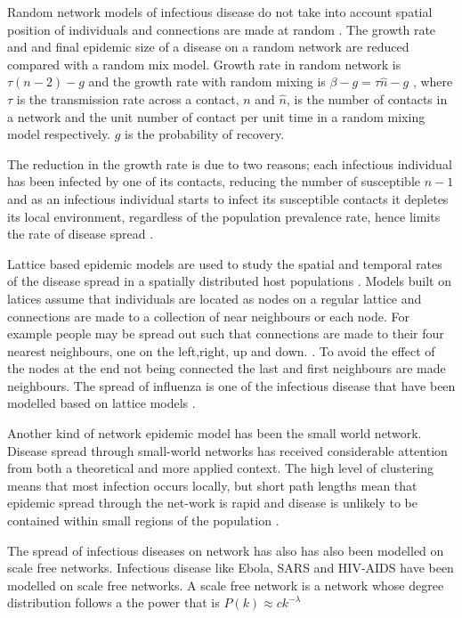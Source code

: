  Random network models of infectious disease do not take into account spatial position of individuals and connections are made at random \citep{keeling2005networks}. The growth rate and and final epidemic size of a disease on a random network are reduced compared with a random mix model. Growth rate in random network is $\tau (n -2) - g$ and the growth rate with random mixing is $\beta - g = \tau \widehat{n} -g$ , where  $\tau$ is the transmission rate across a contact, $n$ and $\widehat{n}$, is the number of contacts in a network and the unit number of contact per unit time in a random mixing model respectively. $g$ is the probability of recovery.
 
The reduction in the growth rate is due to two reasons; each infectious individual has been infected by one of its contacts, reducing the number of susceptible $n-1$ and as an infectious individual starts to infect its susceptible contacts it depletes its local environment, regardless of the population prevalence rate, hence limits the rate of disease spread \citep{keeling2005networks}.

Lattice based epidemic models are used to study the spatial and temporal rates of the disease spread in  a spatially distributed host populations \citep{rhodes1997epidemic}. Models built on latices assume that individuals are located as nodes on a regular lattice and connections are made to a collection of near neighbours or each node. For example people may be spread out such that connections are made to their four nearest neighbours, one on the left,right, up and down. \citep{lloyd2006infection}. To avoid the effect of the nodes at the end not being connected the last and first neighbours are made neighbours. The spread of influenza is one of the infectious disease that have been modelled based on lattice models \citep{liccardo2013lattice}. 

Another kind of network epidemic model has been the small world network. Disease spread through small-world networks has received considerable attention from both a theoretical and more applied context. The high level of clustering means that most infection occurs locally,  but short path lengths mean that epidemic spread through the net-work is rapid and disease is unlikely to be contained within small regions of the population \citep{watts1998collective}.

The spread of infectious diseases on network has also has also been modelled on scale free networks. Infectious disease like Ebola, SARS and HIV-AIDS have been modelled on scale free networks. A scale free network is a network whose degree distribution follows a the power that is $P(k) \approx ck^{-\lambda}$  \citep{morita2016six}


